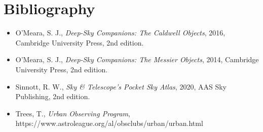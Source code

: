 \chapter*{Bibliography}

\begin{itemize}

\item[] O’Meara, S. J., \emph{Deep-Sky Companions: The Caldwell Objects},  2016, Cambridge University Press, 2nd edition.

\item[] O’Meara, S. J., \emph{Deep-Sky Companions: The Messier Objects},  2014, Cambridge University Press, 2nd edition.

\item[] Sinnott, R. W., \emph{Sky \& Telescope’s Pocket Sky Atlas}, 2020, AAS Sky Publishing, 2nd edition.

\item[] Trees, T., \emph{Urban Observing Program}, \\
https://www.astroleague.org/al/obsclubs/urban/urban.html

\end{itemize}
